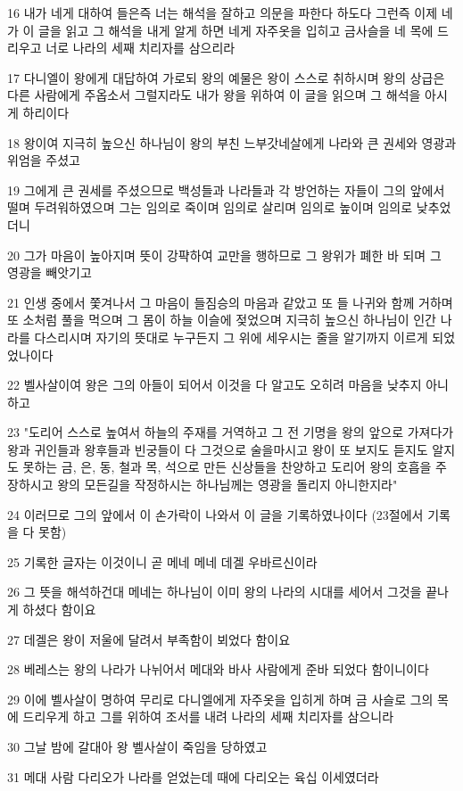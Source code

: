 \par 16 내가 네게 대하여 들은즉 너는 해석을 잘하고 의문을 파한다 하도다 그런즉 이제 네가 이 글을 읽고 그 해석을 내게 알게 하면 네게 자주옷을 입히고 금사슬을 네 목에 드리우고 너로 나라의 세째 치리자를 삼으리라
\par 17 다니엘이 왕에게 대답하여 가로되 왕의 예물은 왕이 스스로 취하시며 왕의 상급은 다른 사람에게 주옵소서 그럴지라도 내가 왕을 위하여 이 글을 읽으며 그 해석을 아시게 하리이다
\par 18 왕이여 지극히 높으신 하나님이 왕의 부친 느부갓네살에게 나라와 큰 권세와 영광과 위엄을 주셨고
\par 19 그에게 큰 권세를 주셨으므로 백성들과 나라들과 각 방언하는 자들이 그의 앞에서 떨며 두려워하였으며 그는 임의로 죽이며 임의로 살리며 임의로 높이며 임의로 낮추었더니
\par 20 그가 마음이 높아지며 뜻이 강퍅하여 교만을 행하므로 그 왕위가 폐한 바 되며 그 영광을 빼앗기고
\par 21 인생 중에서 쫓겨나서 그 마음이 들짐승의 마음과 같았고 또 들 나귀와 함께 거하며 또 소처럼 풀을 먹으며 그 몸이 하늘 이슬에 젖었으며 지극히 높으신 하나님이 인간 나라를 다스리시며 자기의 뜻대로 누구든지 그 위에 세우시는 줄을 알기까지 이르게 되었었나이다
\par 22 벨사살이여 왕은 그의 아들이 되어서 이것을 다 알고도 오히려 마음을 낮추지 아니하고
\par 23 "도리어 스스로 높여서 하늘의 주재를 거역하고 그 전 기명을 왕의 앞으로 가져다가 왕과 귀인들과 왕후들과 빈궁들이 다 그것으로 술을마시고 왕이 또 보지도 듣지도 알지도 못하는 금, 은, 동, 철과 목, 석으로 만든 신상들을 찬양하고 도리어 왕의 호흡을 주장하시고 왕의 모든길을 작정하시는 하나님께는 영광을 돌리지 아니한지라"
\par 24 이러므로 그의 앞에서 이 손가락이 나와서 이 글을 기록하였나이다 (23절에서 기록을 다 못함)
\par 25 기록한 글자는 이것이니 곧 메네 메네 데겔 우바르신이라
\par 26 그 뜻을 해석하건대 메네는 하나님이 이미 왕의 나라의 시대를 세어서 그것을 끝나게 하셨다 함이요
\par 27 데겔은 왕이 저울에 달려서 부족함이 뵈었다 함이요
\par 28 베레스는 왕의 나라가 나뉘어서 메대와 바사 사람에게 준바 되었다 함이니이다
\par 29 이에 벨사살이 명하여 무리로 다니엘에게 자주옷을 입히게 하며 금 사슬로 그의 목에 드리우게 하고 그를 위하여 조서를 내려 나라의 세째 치리자를 삼으니라
\par 30 그날 밤에 갈대아 왕 벨사살이 죽임을 당하였고
\par 31 메대 사람 다리오가 나라를 얻었는데 때에 다리오는 육십 이세였더라

